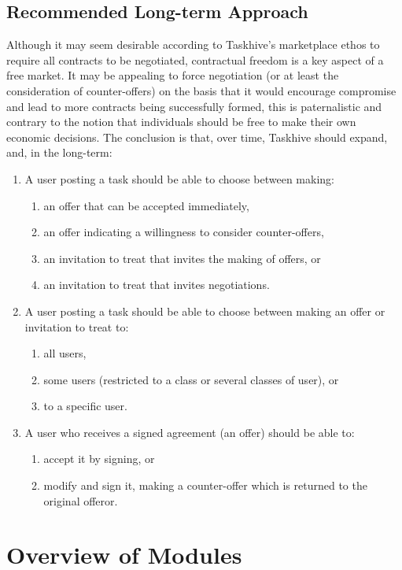 \documentclass[a4paper,12pt]{article}
\begin{document}
\subsection{Recommended Long-term Approach}

Although it may seem desirable according to Taskhive's marketplace ethos to require all contracts to be negotiated, contractual freedom is a key aspect of a free market. It may be appealing to force negotiation (or at least the consideration of counter-offers) on the basis that it would encourage compromise and lead to more contracts being successfully formed, this is paternalistic and contrary to the notion that individuals should be free to make their own economic decisions. The conclusion is that, over time, Taskhive should expand, and, in the long-term:

\begin{enumerate}
	\item A user posting a task should be able to choose between making:
	\begin{enumerate}
		\item an offer that can be accepted immediately,
		\item an offer indicating a willingness to consider counter-offers,
		\item an invitation to treat that invites the making of offers, or
		\item an invitation to treat that invites negotiations.
	\end{enumerate}
	\item A user posting a task should be able to choose between making an offer or invitation to treat to:
	\begin{enumerate}
		\item all users,
		\item some users (restricted to a class or several classes of user), or
		\item to a specific user.
	\end{enumerate}
	\item A user who receives a signed agreement (an offer) should be able to:
	\begin{enumerate}
		\item accept it by signing, or
		\item modify and sign it, making a counter-offer which is returned to the original offeror.
	\end{enumerate}
\end{enumerate}

\section{Overview of Modules}
\end{document}
